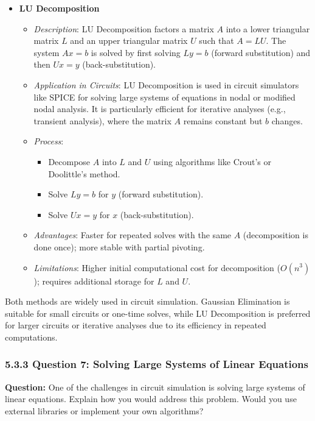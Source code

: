 \documentclass{article}
\begin{document}
\begin{itemize}
    \item \textbf{LU Decomposition}
    \begin{itemize}
        \item \textit{Description}: LU Decomposition factors a matrix \( A \) into a lower triangular matrix \( L \) and an upper triangular matrix \( U \) such that \( A = LU \). The system \( Ax = b \) is solved by first solving \( Ly = b \) (forward substitution) and then \( Ux = y \) (back-substitution).
        \item \textit{Application in Circuits}: LU Decomposition is used in circuit simulators like SPICE for solving large systems of equations in nodal or modified nodal analysis. It is particularly efficient for iterative analyses (e.g., transient analysis), where the matrix \( A \) remains constant but \( b \) changes.
        \item \textit{Process}:
        \begin{itemize}
            \item Decompose \( A \) into \( L \) and \( U \) using algorithms like Crout’s or Doolittle’s method.
            \item Solve \( Ly = b \) for \( y \) (forward substitution).
            \item Solve \( Ux = y \) for \( x \) (back-substitution).
        \end{itemize}
        \item \textit{Advantages}: Faster for repeated solves with the same \( A \) (decomposition is done once); more stable with partial pivoting.
        \item \textit{Limitations}: Higher initial computational cost for decomposition (\( O(n^3) \)); requires additional storage for \( L \) and \( U \).
    \end{itemize}
\end{itemize}

Both methods are widely used in circuit simulation. Gaussian Elimination is suitable for small circuits or one-time solves, while LU Decomposition is preferred for larger circuits or iterative analyses due to its efficiency in repeated computations.

\subsubsection*{5.3.3 Question 7: Solving Large Systems of Linear Equations}

\textbf{Question:} One of the challenges in circuit simulation is solving large systems of linear equations. Explain how you would address this problem. Would you use external libraries or implement your own algorithms?
\end{document}
